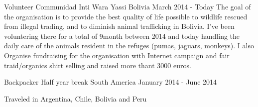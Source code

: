 

\begin{cventries}
  \cventry
    {Volunteer} %
    {Communidad Inti Wara Yassi} %
    {Bolivia} %
    {March 2014 - Today} %
    {
      The goal of the organisation is to provide the best quality of life possible to wildlife rescued from illegal trading, and to diminish animal trafficking in Bolivia.
I've been voluntering there for a total of 9month between 2014 and today handling the daily care of the animals resident in the refuges (pumas, jaguars, monkeys).
I also Organise fundraising for the organisation with Internet campaign and fair traid/organics shirt selling and raised more thant 3000 euros.
    }

  \cventry
    {Backpacker} %
    {Half year break} %
    {South America} %
    {January 2014 - June 2014} %
    {
      \begin{cvitems} %
        \item {Traveled in Argentina, Chile, Bolivia and Peru}
      \end{cvitems}
    }
\end{cventries}
